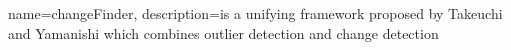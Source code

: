 {
  name=changeFinder,
  description={is a unifying framework proposed by Takeuchi and Yamanishi \cite{takeuchi2006unifying} which combines outlier detection and change detection}
}